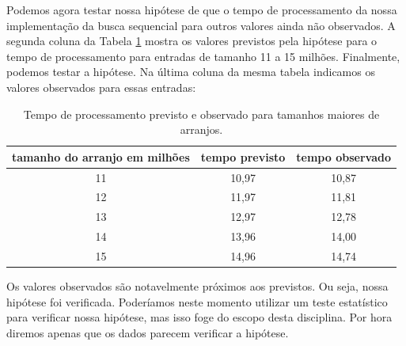 Podemos agora testar nossa hipótese de que o tempo de processamento da nossa implementação da busca sequencial para outros valores ainda não observados.
A segunda coluna da Tabela \ref{tab:verificacao} mostra os valores previstos pela hipótese para o tempo de processamento para entradas de tamanho 11 a 15 milhões.
Finalmente, podemos testar a hipótese.
Na última coluna da mesma tabela indicamos os valores observados para essas entradas:

\begin{table}
  \label{tab:verificacao}
  \begin{tabular}{|c|c|c|}
    \hline
    tamanho do arranjo em milhões & tempo previsto & tempo observado \\
    \hline 
    11                             & 10,97         & 10,87           \\
    12                             & 11,97         & 11,81           \\
    13                             & 12,97         & 12,78           \\
    14                             & 13,96         & 14,00           \\
    15                             & 14,96         & 14,74           \\
    \hline
  \end{tabular}
  \caption{Tempo de processamento previsto e observado para tamanhos maiores de arranjos.}
\end{table}

Os valores observados são notavelmente próximos aos previstos.
Ou seja, nossa hipótese foi verificada.
Poderíamos neste momento utilizar um teste estatístico para verificar nossa hipótese, mas isso foge do escopo desta disciplina.
Por hora diremos apenas que os dados parecem verificar a hipótese.

